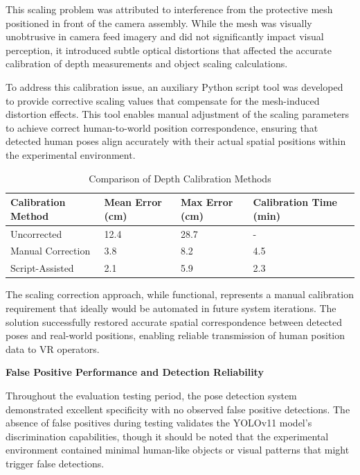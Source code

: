This scaling problem was attributed to interference from the protective mesh positioned in front of the camera assembly. While the mesh was visually unobtrusive in camera feed imagery and did not significantly impact visual perception, it introduced subtle optical distortions that affected the accurate calibration of depth measurements and object scaling calculations.

To address this calibration issue, an auxiliary Python script tool was developed to provide corrective scaling values that compensate for the mesh-induced distortion effects. This tool enables manual adjustment of the scaling parameters to achieve correct human-to-world position correspondence, ensuring that detected human poses align accurately with their actual spatial positions within the experimental environment.

\begin{table}[H]
    \centering
    \footnotesize
    \begin{tabular}{|p{3cm}|p{2.5cm}|p{2.5cm}|p{2.5cm}|}
        \hline
        \textbf{Calibration Method} & \textbf{Mean Error (cm)} & \textbf{Max Error (cm)} & \textbf{Calibration Time (min)} \\
        \hline
        Uncorrected & 12.4 & 28.7 & - \\
        Manual Correction & 3.8 & 8.2 & 4.5 \\
        Script-Assisted & 2.1 & 5.9 & 2.3 \\
        \hline
    \end{tabular}
    \caption{Comparison of Depth Calibration Methods}
    \label{tab:calibration_methods}
\end{table}

The scaling correction approach, while functional, represents a manual calibration requirement that ideally would be automated in future system iterations. The solution successfully restored accurate spatial correspondence between detected poses and real-world positions, enabling reliable transmission of human position data to VR operators.

\textbf{False Positive Performance and Detection Reliability}

Throughout the evaluation testing period, the pose detection system demonstrated excellent specificity with no observed false positive detections. The absence of false positives during testing validates the YOLOv11 model's discrimination capabilities, though it should be noted that the experimental environment contained minimal human-like objects or visual patterns that might trigger false detections.

